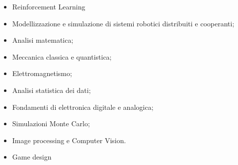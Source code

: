\documentclass[a4paper,12pt]{article} %
\begin{document}
\begin{table}[h!]
\centering
{}
\end{table}

\Sep 



\begin{itemize}
\item Reinforcement Learning
\item Modellizzazione e simulazione di sistemi robotici distribuiti e cooperanti;
\item Analisi matematica;
\item Meccanica classica e quantistica;
\item Elettromagnetismo;
\item Analisi statistica dei dati;
\item Fondamenti di elettronica digitale e analogica;
\item Simulazioni Monte Carlo;
\item Image processing e Computer Vision.
\item Game design 
\end{itemize}

\clearpage
\userinformation
\framebreak
{}

\end{document}
